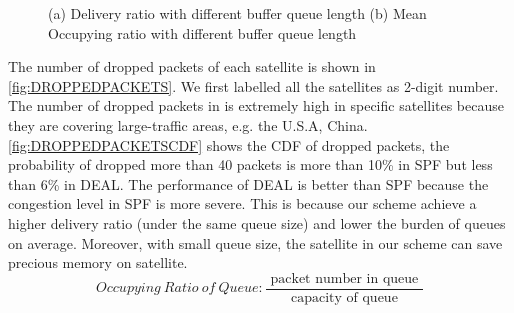 \begin{figure}[htp]
	\centering
\caption{ (a) Delivery ratio with different buffer queue length (b) Mean Occupying ratio with different buffer queue length}
\label{fig:QUEUE}
\end{figure}

The number of dropped packets of each satellite is shown in \ref{fig:DROPPEDPACKETS}. We first labelled all the satellites as 2-digit number. The number of dropped packets in is extremely high in specific satellites because they are covering large-traffic areas, e.g. the U.S.A, China.  \ref{fig:DROPPEDPACKETSCDF} shows the CDF of dropped packets, the probability of dropped more than 40 packets is more than  10\%  in  SPF but less than 6\% in DEAL.  The performance of DEAL is better than SPF because the congestion level in  SPF is more severe. This is because our scheme  achieve a higher delivery ratio (under the same queue size) and lower the burden of queues on average. Moreover, with small queue size, the satellite in our scheme can save precious memory on satellite.
\begin{equation}
  Occupying\ Ratio\ of\ Queue :  \frac{\text { packet number in queue }}{\text { capacity of queue }} 
\end{equation}

